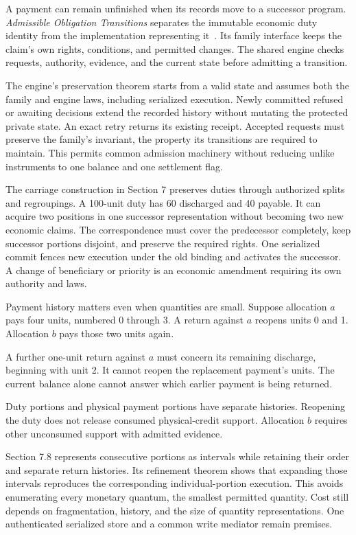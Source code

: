 \documentclass{momentum}
\begin{document}
A payment can remain unfinished when its records move to a successor program. \emph{Admissible Obligation Transitions} separates the immutable economic duty identity from the implementation representing it~\cite{aot}. Its family interface keeps the claim's own rights, conditions, and permitted changes. The shared engine checks requests, authority, evidence, and the current state before admitting a transition.

The engine's preservation theorem starts from a valid state and assumes both the family and engine laws, including serialized execution. Newly committed refused or awaiting decisions extend the recorded history without mutating the protected private state. An exact retry returns its existing receipt. Accepted requests must preserve the family's invariant, the property its transitions are required to maintain. This permits common admission machinery without reducing unlike instruments to one balance and one settlement flag.

The carriage construction in Section 7 preserves duties through authorized splits and regroupings. A 100-unit duty has 60 discharged and 40 payable. It can acquire two positions in one successor representation without becoming two new economic claims. The correspondence must cover the predecessor completely, keep successor portions disjoint, and preserve the required rights. One serialized commit fences new execution under the old binding and activates the successor. A change of beneficiary or priority is an economic amendment requiring its own authority and laws.

Payment history matters even when quantities are small. Suppose allocation $a$ pays four units, numbered 0 through 3. A return against $a$ reopens units 0 and 1. Allocation $b$ pays those two units again.

A further one-unit return against $a$ must concern its remaining discharge, beginning with unit 2. It cannot reopen the replacement payment's units. The current balance alone cannot answer which earlier payment is being returned.

Duty portions and physical payment portions have separate histories. Reopening the duty does not release consumed physical-credit support. Allocation $b$ requires other unconsumed support with admitted evidence.

Section 7.8 represents consecutive portions as intervals while retaining their order and separate return histories. Its refinement theorem shows that expanding those intervals reproduces the corresponding individual-portion execution. This avoids enumerating every monetary quantum, the smallest permitted quantity. Cost still depends on fragmentation, history, and the size of quantity representations. One authenticated serialized store and a common write mediator remain premises.
\end{document}

